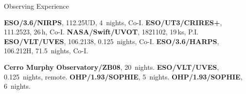 \begin{rubric}{Observing Experience}

\entry*[2023]
    \textbf{ESO/3.6/NIRPS}, 112.25UD, 4~nights, Co-I.
\entry*[2023]
    \textbf{ESO/UT3/CRIRES+}, 111.2523, 26\,h, Co-I.
\entry*[2022]
    \textbf{NASA/Swift/UVOT}, 1821102, 19\,ks, P.I.
\entry*[2020]
    \textbf{ESO/VLT/UVES}, 106.2138, 0.125~nights, Co-I.
\entry*[2020]
    \textbf{ESO/3.6/HARPS}, 106.212H, 71.5~nights, Co-I.

\entry*[2024]
    \textbf{Cerro Murphy Observatory/ZB08}, 20~nights.
\entry*[2020]
    \textbf{ESO/VLT/UVES}, 0.125~nights, remote.
\entry*[2020]
    \textbf{OHP/1.93/SOPHIE}, 5~nights.
\entry*[2019]
    \textbf{OHP/1.93/SOPHIE}, 6~nights.

\end{rubric}